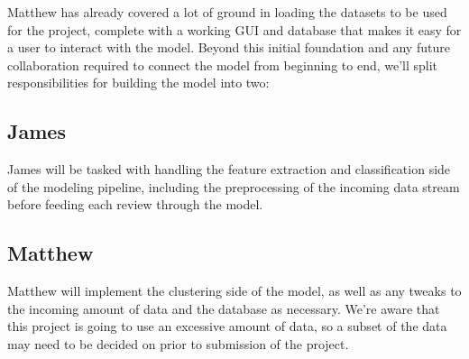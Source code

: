 

Matthew has already covered a lot of ground in loading the datasets to be used for the project,
complete with a working GUI and database that makes it easy for a user to interact with the model.
Beyond this initial foundation and any future collaboration required to connect the model from 
beginning to end, we'll split responsibilities for building the model into two:

\subsection{James}
	James will be tasked with handling the feature extraction and classification side of
	the modeling pipeline, including the preprocessing of the incoming data stream before feeding
	each review through the model.
	
\subsection{Matthew}
	Matthew will implement the clustering side of the model, as well as any tweaks to the incoming
	amount of data and the database as necessary. We're aware that this project is going to use an
	excessive amount of data, so a subset of the data may need to be decided on prior to 
	submission of the project.